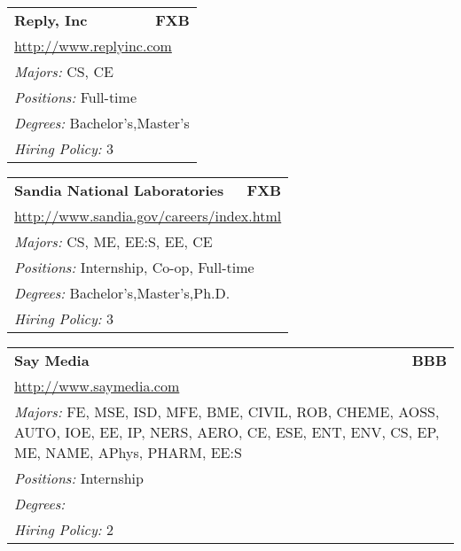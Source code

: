 \documentclass[twoside]{article}
\begin{document}
\begin{center}
\begin{multicols}{3}
\begin{FlushLeft}
\begin{minipage}{\columnwidth}
\end{minipage}
 
\begin{minipage}{\columnwidth}\begin{tabularx}{.95\columnwidth}{Xr}
                 {\Large\bf Reply, Inc} & {\Large\bf FXB}\\
    \multicolumn{2}{p{.95\columnwidth}}{\url{http://www.replyinc.com}}\\
    \multicolumn{2}{p{.95\columnwidth}}{\emph{Majors:} CS, CE}\\
    \multicolumn{2}{p{.95\columnwidth}}{\emph{Positions:} Full-time}\\
    \multicolumn{2}{p{.95\columnwidth}}{\emph{Degrees:} Bachelor's,Master's}\\
    \multicolumn{2}{p{.95\columnwidth}}{\emph{Hiring Policy:} 3}\\
    \end{tabularx}
    
\end{minipage}
 
\begin{minipage}{\columnwidth}\begin{tabularx}{.95\columnwidth}{Xr}
                 {\Large\bf Sandia National Laboratories} & {\Large\bf FXB}\\
    \multicolumn{2}{p{.95\columnwidth}}{\url{http://www.sandia.gov/careers/index.html}}\\
    \multicolumn{2}{p{.95\columnwidth}}{\emph{Majors:} CS, ME, EE:S, EE, CE}\\
    \multicolumn{2}{p{.95\columnwidth}}{\emph{Positions:} Internship, Co-op, Full-time}\\
    \multicolumn{2}{p{.95\columnwidth}}{\emph{Degrees:} Bachelor's,Master's,Ph.D.}\\
    \multicolumn{2}{p{.95\columnwidth}}{\emph{Hiring Policy:} 3}\\
    \end{tabularx}
    
\end{minipage}
 
\begin{minipage}{\columnwidth}\begin{tabularx}{.95\columnwidth}{Xr}
                 {\Large\bf Say Media} & {\Large\bf BBB}\\
    \multicolumn{2}{p{.95\columnwidth}}{\url{http://www.saymedia.com}}\\
    \multicolumn{2}{p{.95\columnwidth}}{\emph{Majors:} FE, MSE, ISD, MFE, BME, CIVIL, ROB, CHEME, AOSS, AUTO, IOE, EE, IP, NERS, AERO, CE, ESE, ENT, ENV, CS, EP, ME, NAME, APhys, PHARM, EE:S}\\
    \multicolumn{2}{p{.95\columnwidth}}{\emph{Positions:} Internship}\\
    \multicolumn{2}{p{.95\columnwidth}}{\emph{Degrees:} }\\
    \multicolumn{2}{p{.95\columnwidth}}{\emph{Hiring Policy:} 2}\\
    \end{tabularx}
    

\end{minipage}
\end{FlushLeft}
\end{multicols}
\end{center}
\end{document}
